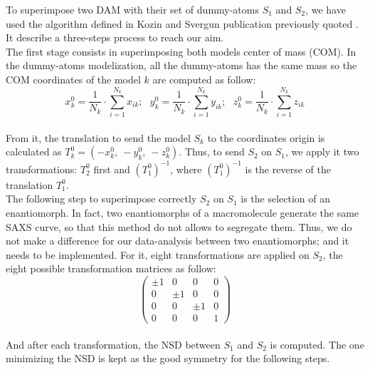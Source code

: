 \documentclass[a4paper, 11pt]{report}
\begin{document}
To superimpose two DAM with their set of dummy-atoms $S_{1}$ and 
$S_{2}$, we have used the algorithm defined in Kozin and Svergun 
publication previously quoted \cite{supcomb}. 
It describe a three-steps process to reach our aim.\\

The first stage consists in superimposing both models center of mass 
(COM). 
In the dummy-atoms modelization, all the dummy-atoms has the same mass 
so the COM coordinates of the model $k$ are computed as follow:
\[
x_{k}^0 = \frac{1}{N_{k}} \cdot \sum\limits_{i=1}^{N_{k}} x_{ik};\ \ \ 
y_{k}^0 = \frac{1}{N_{k}} \cdot \sum\limits_{i=1}^{N_{k}} y_{ik};\ \ \ 
z_{k}^0 = \frac{1}{N_{k}} \cdot \sum\limits_{i=1}^{N_{k}} z_{ik}
\]\\
From it, the translation to send the model $S_{k}$ to the coordinates 
origin is calculated as $T_{k}^0 = (-x_{k}^0,\ -y_{k}^0,\ -z_{k}^0)$. 
Thus, to send $S_{2}$ on $S_{1}$, we apply it two transformations: 
$T_{2}^0$ first and $(T_{1}^0)^{-1}$, where $(T_{1}^0)^{-1}$ is the 
reverse of the translation $T_{1}^0$.\\

The following step to superimpose correctly $S_{2}$ on $S_{1}$ is the 
selection of an enantiomorph. 
In fact, two enantiomorphs of a macromolecule generate the same SAXS 
curve, so that this method do not allows to segregate them. 
Thus, we do not make a difference for our data-analysis between two 
enantiomorphs; and it needs to be implemented. 
For it, eight transformations are applied on $S_{2}$, the eight 
possible transformation matrices as follow:
\[
\begin{pmatrix}
 \pm 1 & 0 & 0 & 0 \\
 0 & \pm 1 & 0 & 0 \\
 0 & 0 & \pm 1 & 0 \\
 0 & 0 & 0 & 1
\end{pmatrix}
\]\\
And after each transformation, the NSD between $S_{1}$ and $S_{2}$ is 
computed. 
The one minimizing the NSD is kept as the good symmetry for the 
following steps.\\
\end{document}
